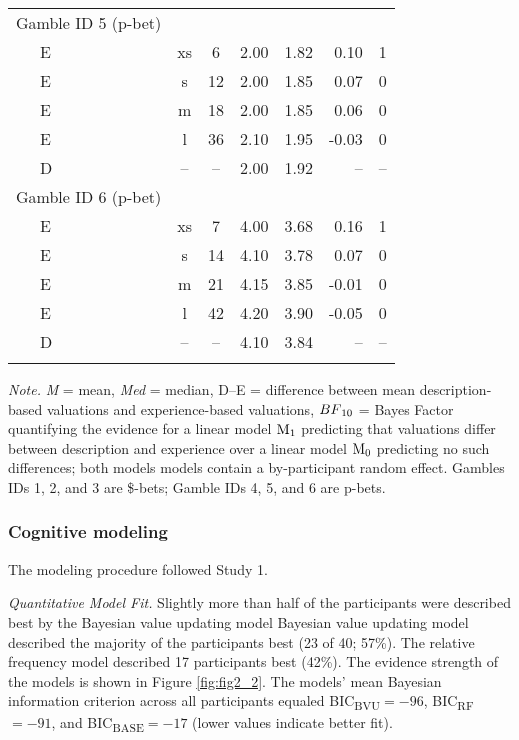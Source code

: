 \documentclass[a4paper, man, floatsintext]{apa6}
\begin{document}
\begin{table}[tbp]
\begin{center}
\begin{threeparttable}
\begin{tabular}{lccccrr}
Gamble ID 5 (p-bet) &  &  &  &  &  & \\
\ \ \ E & xs & 6 & 2.00 & 1.82 & 0.10 & 1\\
\ \ \ E & s & 12 & 2.00 & 1.85 & 0.07 & 0\\
\ \ \ E & m & 18 & 2.00 & 1.85 & 0.06 & 0\\
\ \ \ E & l & 36 & 2.10 & 1.95 & -0.03 & 0\\
\ \ \ D & -- & -- & 2.00 & 1.92 & -- & --\\
Gamble ID 6 (p-bet) &  &  &  &  &  & \\
\ \ \ E & xs & 7 & 4.00 & 3.68 & 0.16 & 1\\
\ \ \ E & s & 14 & 4.10 & 3.78 & 0.07 & 0\\
\ \ \ E & m & 21 & 4.15 & 3.85 & -0.01 & 0\\
\ \ \ E & l & 42 & 4.20 & 3.90 & -0.05 & 0\\
\ \ \ D & -- & -- & 4.10 & 3.84 & -- & --\\
\bottomrule
\addlinespace
\end{tabular}

\begin{tablenotes}[para]
\normalsize{\textit{Note.} \textit{M} = mean, \textit{Med} = median, D--E = difference between mean description-based valuations and experience-based valuations, $BF\textsubscript{10}$ = Bayes Factor quantifying the evidence for a linear model $\mathrm{M}\textsubscript{1}$ predicting that valuations differ between description and experience over a linear model $\mathrm{M}\textsubscript{0}$ predicting no such differences; both models models contain a by-participant random effect. Gambles IDs 1, 2, and 3 are \$-bets; Gamble IDs 4, 5, and 6 are p-bets.}
\end{tablenotes}

\end{threeparttable}
\end{center}

\end{table}

\subsubsection{Cognitive modeling}

The modeling procedure followed Study 1.

\textit{Quantitative Model Fit.} Slightly more than half of the
participants were described best by the Bayesian value updating model
Bayesian value updating model described the majority of the participants
best (23 of 40; 57\%). The relative frequency model described 17
participants best (42\%). The evidence strength of the models is shown
in Figure \ref{fig:fig2_2}. The models' mean Bayesian information
criterion across all participants equaled
BIC\textsubscript{BVU}\(= -96\), BIC\textsubscript{RF}\(= -91\), and
BIC\textsubscript{BASE}\(= -17\) (lower values indicate better fit).
\end{document}
